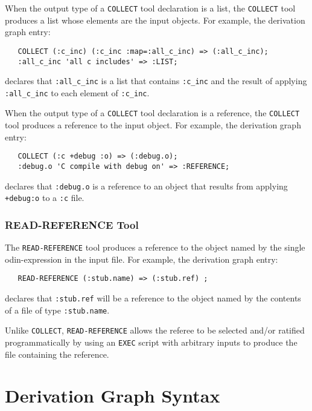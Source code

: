 \documentclass[hidelinks]{report}
\newcommand{\ex}{\tt}   %
\begin{document}
When the output type of a {\ex COLLECT} tool declaration is a list,
the {\ex COLLECT} tool produces a list whose elements are the input objects.
For example, the derivation graph entry:
\begin{verbatim}
   COLLECT (:c_inc) (:c_inc :map=:all_c_inc) => (:all_c_inc);
   :all_c_inc 'all c includes' => :LIST;
\end{verbatim}
declares that {\ex :all\_c\_inc} is a list that contains {\ex :c\_inc}
and the result of applying {\ex :all\_c\_inc} to each element of {\ex :c\_inc}.

When the output type of a {\ex COLLECT} tool declaration is a reference,
the {\ex COLLECT} tool produces a reference to the input object.
For example, the derivation graph entry:
\begin{verbatim}
   COLLECT (:c +debug :o) => (:debug.o);
   :debug.o 'C compile with debug on' => :REFERENCE;
\end{verbatim}
declares that {\ex :debug.o} is a reference to an object that
results from applying {\ex +debug:o} to a {\ex :c} file.

\subsection{READ-REFERENCE Tool}

The {\ex READ-REFERENCE} tool produces a reference to
the object named by the single odin-expression in the input file.
For example, the derivation graph entry:
\begin{verbatim}
   READ-REFERENCE (:stub.name) => (:stub.ref) ;
\end{verbatim}
declares that {\ex :stub.ref} will be a reference
to the object named by the contents of
a file of type {\ex :stub.name}.

Unlike {\ex COLLECT}, {\ex READ-REFERENCE} allows the referee to be selected
and/or ratified programmatically by using an {\ex EXEC} script with
arbitrary inputs to produce the file containing the reference.

\chapter{Derivation Graph Syntax}
\end{document}
